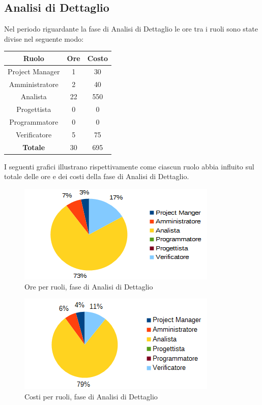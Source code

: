 	\subsection{Analisi di Dettaglio}
	Nel periodo riguardante la fase di Analisi di Dettaglio le ore tra i ruoli sono state divise nel seguente modo: \\
	\begin{table}[H]
		\centering
		\begin{tabular}{|c|c|c|}
			\hline
			\textbf{Ruolo}		& \textbf{Ore}	& \textbf{Costo} \\
			\hline
			Project Manager		& 1				& 30	\\
			Amministratore		& 2				& 40	\\
			Analista			& 22			& 550	\\
			Progettista			& 0				& 0	\\
			Programmatore		& 0				& 0	\\
			Verificatore		& 5				& 75	\\
			\hline
			\textbf{Totale}		& 30			& 695	\\
			\hline
		\end{tabular}
		\end{table}
	I seguenti grafici illustrano rispettivamente come ciascun ruolo abbia influito sul totale
delle ore e dei costi della fase di Analisi di Dettaglio. \\
	\begin{figure}[H]
		\centering
		\includegraphics[scale=1]{immagini/grafici/analisi_dettaglio-torta.png}
		\caption{Ore per ruoli, fase di Analisi di Dettaglio}
	\end{figure}
	\begin{figure}[H]
		\centering
		\includegraphics[scale=1]{immagini/grafici/analisi_dettaglio-torta-costo.png}
		\caption{Costi per ruoli, fase di Analisi di Dettaglio}
	\end{figure}
